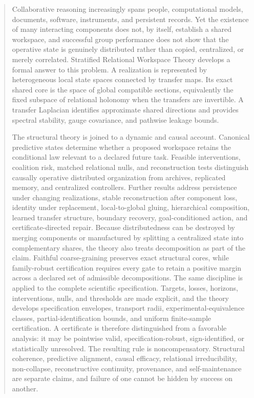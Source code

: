 \documentclass[11pt,letterpaper]{article}
\theoremstyle{plain}
\theoremstyle{definition}
\begin{document}
\begin{abstract}
Collaborative reasoning increasingly spans people, computational models, documents, software,
instruments, and persistent records. Yet the existence of many interacting components does not,
by itself, establish a shared workspace, and successful group performance does not show that the
operative state is genuinely distributed rather than copied, centralized, or merely correlated.
Stratified Relational Workspace Theory develops a formal answer to this problem. A realization
is represented by heterogeneous local state spaces connected by transfer maps. Its exact shared
core is the space of global compatible sections, equivalently the fixed subspace of relational
holonomy when the transfers are invertible. A transfer Laplacian identifies approximate shared
directions and provides spectral stability, gauge covariance, and pathwise leakage bounds.

The structural theory is joined to a dynamic and causal account. Canonical predictive states
determine whether a proposed workspace retains the conditional law relevant to a declared
future task. Feasible interventions, coalition risk, matched relational nulls, and reconstruction
tests distinguish causally operative distributed organization from archives, replicated memory,
and centralized controllers. Further results address persistence under changing realizations,
stable reconstruction after component loss, identity under replacement, local-to-global gluing,
hierarchical composition, learned transfer structure, boundary recovery, goal-conditioned action,
and certificate-directed repair. Because distributedness can be destroyed by merging components
or manufactured by splitting a centralized state into complementary shares, the theory also treats
decomposition as part of the claim. Faithful coarse-graining preserves exact structural cores, while
family-robust certification requires every gate to retain a positive margin across a declared set of
admissible decompositions. The same discipline is applied to the complete scientific specification.
Targets, losses, horizons, interventions, nulls, and thresholds are made explicit, and the theory develops
specification envelopes, transport radii, experimental-equivalence classes, partial-identification bounds,
and uniform finite-sample certification. A certificate is therefore distinguished from a favorable
analysis: it may be pointwise valid, specification-robust, sign-identified, or statistically unresolved.
The resulting rule is noncompensatory. Structural coherence, predictive alignment, causal efficacy,
relational irreducibility, non-collapse, reconstructive continuity, provenance, and self-maintenance are
separate claims, and failure of one cannot be hidden by success on another.


\end{abstract}
\end{document}
